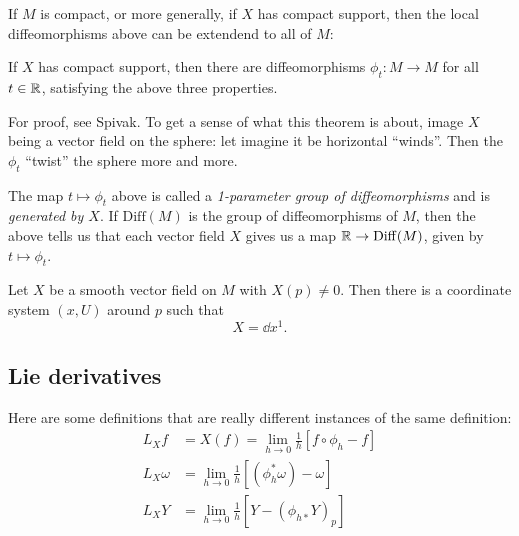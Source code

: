 \documentclass[11pt, english]{article}
\begin{document}
If $M$ is compact, or more generally, if $X$ has compact support, then the local diffeomorphisms above can be extendend to all of $M$:

\begin{thm}
If $X$ has compact support, then there are diffeomorphisms $\phi_t:M \to M$ for all $t \in \mathbb{R}$, satisfying the above three properties.
\end{thm}

For proof, see Spivak. To get a sense of what this theorem is about, image $X$ being a vector field on the sphere: let imagine it be horizontal ``winds''. Then the $\phi_t$ ``twist'' the sphere more and more.

The map $t \mapsto \phi_t$ above is called a \emph{1-parameter group of diffeomorphisms} and is \emph{generated by $X$}. If $\mathrm{Diff}(M)$ is the group of diffeomorphisms of $M$, then the above tells us that each vector field $X$ gives us a map $\mathbb{R} \to \mathrm{Diff}(M)$, given by $t \mapsto \phi_t$. 

\begin{thm}
  Let $X$ be a smooth vector field on $M$ with $X(p) \neq 0$. Then there is a coordinate system $(x,U)$ around $p$ such that
\[
X = \dd{}{x^1}.
\]
\end{thm}

\subsection{Lie derivatives}

Here are some definitions that are really different instances of the same definition: 
\begin{align*}
  L_Xf &= X(f) = \lim_{h \to 0} \frac 1h \left[ f \circ \phi_h - f \right] \\ 
L_X \omega &= \lim_{h \to 0} \frac 1h \left[ (\phi_h^\ast \omega)-\omega \right] \\
L_XY &= \lim_{h \to 0} \frac 1h \left[ Y-(\phi_{h\ast}Y)_p \right]
\end{align*}
\end{document}
